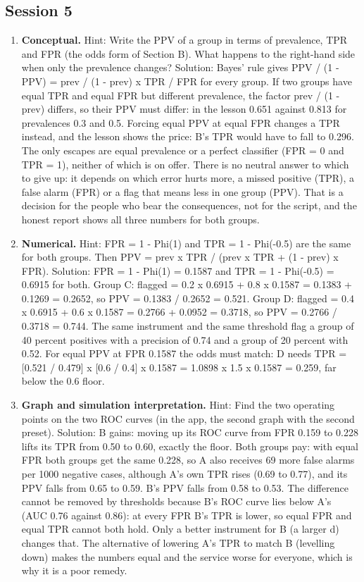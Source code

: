 \documentclass[11pt,a4paper]{article}
\begin{document}
\subsection*{Session 5}
\begin{enumerate}[nosep]
\item \textbf{Conceptual.} Hint: Write the PPV of a group in terms of prevalence, TPR and FPR (the odds form of Section B). What happens to the right-hand side when only the prevalence changes? Solution: Bayes' rule gives PPV / (1 - PPV) = prev / (1 - prev) x TPR / FPR for every group. If two groups have equal TPR and equal FPR but different prevalence, the factor prev / (1 - prev) differs, so their PPV must differ: in the lesson 0.651 against 0.813 for prevalences 0.3 and 0.5. Forcing equal PPV at equal FPR changes a TPR instead, and the lesson shows the price: B's TPR would have to fall to 0.296. The only escapes are equal prevalence or a perfect classifier (FPR = 0 and TPR = 1), neither of which is on offer. There is no neutral answer to which to give up: it depends on which error hurts more, a missed positive (TPR), a false alarm (FPR) or a flag that means less in one group (PPV). That is a decision for the people who bear the consequences, not for the script, and the honest report shows all three numbers for both groups.
\item \textbf{Numerical.} Hint: FPR = 1 - Phi(1) and TPR = 1 - Phi(-0.5) are the same for both groups. Then PPV = prev x TPR / (prev x TPR + (1 - prev) x FPR). Solution: FPR = 1 - Phi(1) = 0.1587 and TPR = 1 - Phi(-0.5) = 0.6915 for both. Group C: flagged = 0.2 x 0.6915 + 0.8 x 0.1587 = 0.1383 + 0.1269 = 0.2652, so PPV = 0.1383 / 0.2652 = 0.521. Group D: flagged = 0.4 x 0.6915 + 0.6 x 0.1587 = 0.2766 + 0.0952 = 0.3718, so PPV = 0.2766 / 0.3718 = 0.744. The same instrument and the same threshold flag a group of 40 percent positives with a precision of 0.74 and a group of 20 percent with 0.52. For equal PPV at FPR 0.1587 the odds must match: D needs TPR = [0.521 / 0.479] x [0.6 / 0.4] x 0.1587 = 1.0898 x 1.5 x 0.1587 = 0.259, far below the 0.6 floor.
\item \textbf{Graph and simulation interpretation.} Hint: Find the two operating points on the two ROC curves (in the app, the second graph with the second preset). Solution: B gains: moving up its ROC curve from FPR 0.159 to 0.228 lifts its TPR from 0.50 to 0.60, exactly the floor. Both groups pay: with equal FPR both groups get the same 0.228, so A also receives 69 more false alarms per 1000 negative cases, although A's own TPR rises (0.69 to 0.77), and its PPV falls from 0.65 to 0.59. B's PPV falls from 0.58 to 0.53. The difference cannot be removed by thresholds because B's ROC curve lies below A's (AUC 0.76 against 0.86): at every FPR B's TPR is lower, so equal FPR and equal TPR cannot both hold. Only a better instrument for B (a larger d) changes that. The alternative of lowering A's TPR to match B (levelling down) makes the numbers equal and the service worse for everyone, which is why it is a poor remedy.

\end{enumerate}
\end{document}
